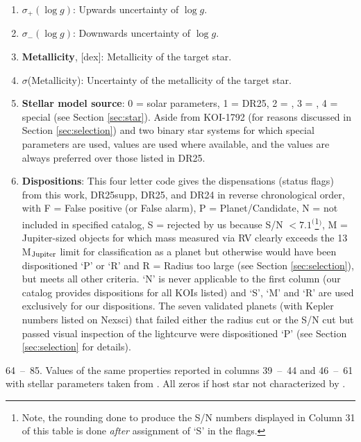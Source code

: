 \documentclass{aastex62}
\newcommand{\gaia}{{\it Gaia~}}
\newcommand{\logg}{\ensuremath{\log{g}}}
\begin{document}
\begin{enumerate}
   \item \textbf{$\sigma_+(\logg)$}:  Upwards uncertainty of \logg.
   \item \textbf{$\sigma_-(\logg)$}:  Downwards uncertainty of \logg.
   \item \textbf{Metallicity}, [dex]:  Metallicity of the target star.
   \item \textbf{$\sigma$}(Metallicity):  Uncertainty of the metallicity of the target star. 
   \item \textbf{Stellar model source}:  0 = solar parameters, 1 = DR25, 2 = \citet{Berger:2020a}, 3 = \citet{Fulton:2018}, 4 = special (see Section \ref{sec:star}). {Aside from KOI-1792 (for reasons discussed in Section \ref{sec:selection}) and two binary star systems for which special parameters are used, }\citet{Fulton:2018} values are used where available, and the \citet{Berger:2020a} values are always preferred over those listed in DR25.
 \item \textbf{Dispositions}: This four letter code gives the dispensations (status flags) from this work, DR25supp, DR25, and DR24 in reverse chronological order, with F = False positive (or False alarm), P = Planet/Candidate, N = not included in specified catalog,  S = rejected by us because S/N $<7.1^($\footnote{Note, the rounding done to produce the S/N numbers displayed in Column 31 of this table is done \emph{after} assignment of `S' in the flags. }$^)$, M = Jupiter-sized objects for which mass measured via RV clearly exceeds the 13 M$_{\rm Jupiter}$ limit for classification as a planet but otherwise would have been dispositioned `P' or `R' and R = Radius too large (see Section \ref{sec:selection}), but meets all other criteria. `N' is never applicable to the first column (our catalog provides dispositions for all KOIs listed) and `S', `M' and `R' are used exclusively for our dispositions. {The seven validated planets (with Kepler numbers listed on Nexsci) that failed either the radius cut or the S/N cut but passed visual inspection of the lightcurve were dispositioned `P' (see Section \ref{sec:selection} for details).}
\end{enumerate}

64~--~85. Values of the same properties reported in columns 39~--~44 and 46~--~61 with stellar parameters taken from \cite{Berger:2020a}. All zeros if host star not characterized by \cite{Berger:2020a}.\\
\end{document}
